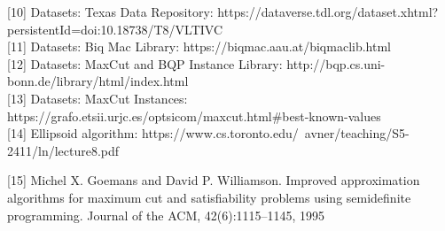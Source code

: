 \documentclass{article}
\begin{document}
[10] Datasets: Texas Data Repository:
https://dataverse.tdl.org/dataset.xhtml?persistentId=doi:10.18738/T8/VLTIVC\\  

[11] Datasets: Biq Mac Library:
https://biqmac.aau.at/biqmaclib.html\\ 

[12] Datasets: MaxCut and BQP Instance Library:
http://bqp.cs.uni-bonn.de/library/html/index.html\\ 

[13] Datasets: MaxCut Instances:
https://grafo.etsii.urjc.es/optsicom/maxcut.html#best-known-values\\

[14] Ellipsoid algorithm: https://www.cs.toronto.edu/~avner/teaching/S5-2411/ln/lecture8.pdf

[15] Michel X. Goemans and David P. Williamson. Improved approximation algorithms for maximum cut and satisfiability problems using semidefinite programming. Journal of the ACM, 42(6):1115–1145, 1995
\end{document}
